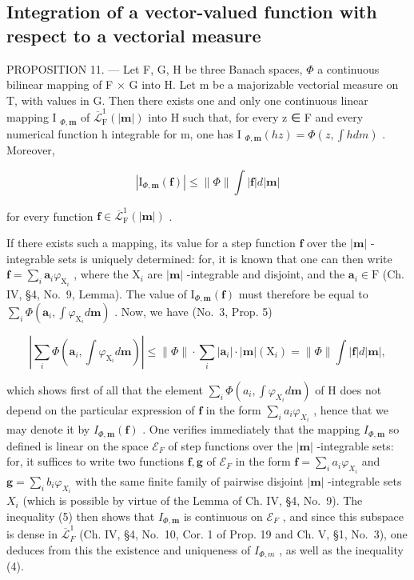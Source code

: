 \subsection{Integration of a vector-valued function with respect to a vectorial measure}

PROPOSITION 11. --- Let F, G, H be three Banach spaces, \(\Phi\) a continuous bilinear mapping of F × G into H. Let m be a majorizable vectorial measure on T, with values in G. Then there exists one and only one continuous linear mapping I \(_{\Phi,\mathbf{m}}\) of \(\overline{\mathcal{L}}_{\mathrm{F}}^{1}(|\mathbf{m}|)\) into H such that, for every z ∈ F and every numerical function h integrable for \textbar m\textbar, one has I \(_{\Phi,\mathbf{m}}(hz) = \Phi(z, \int h dm)\) . Moreover,

\[
\left| \mathrm{I} _ {\Phi , \mathbf {m}} (\mathbf {f}) \right| \leqslant \| \Phi \| \int | \mathbf {f} | d | \mathbf {m} |\tag{4}
\]

for every function \(\mathbf{f} \in \overline{\mathcal{L}}_{\mathrm{F}}^{1}(|\mathbf{m}|)\) .

If there exists such a mapping, its value for a step function \(\mathbf{f}\) over the \(|\mathbf{m}|\) -integrable sets is uniquely determined: for, it is known that one can then write \(\mathbf{f} = \sum_{i} \mathbf{a}_{i} \varphi_{\mathrm{X}_{i}}\) , where the \(\mathrm{X}_{i}\) are \(|\mathbf{m}|\) -integrable and disjoint, and the \(\mathbf{a}_{i} \in \mathrm{F}\) (Ch. IV, §4, No.~9, Lemma). The value of \(\mathrm{I}_{\Phi, \mathbf{m}}(\mathbf{f})\) must therefore be equal to \(\sum_{i} \Phi(\mathbf{a}_{i}, \int \varphi_{\mathrm{X}_{i}} d\mathbf{m})\) . Now, we have (No.~3, Prop. 5)

\[
\left| \sum_ {i} \Phi (\mathbf {a} _ {i}, \int \varphi_ {\mathrm{X} _ {i}} d \mathbf {m}) \right| \leqslant \| \Phi \| \cdot \sum_ {i} | \mathbf {a} _ {i} | \cdot | \mathbf {m} | (\mathrm{X} _ {i}) = \| \Phi \| \int | \mathbf {f} | d | \mathbf {m} |,\tag{5}
\]

which shows first of all that the element \(\sum_{i} \Phi(a_i, \int \varphi_{X_i} d\mathbf{m})\) of H does not depend on the particular expression of \(\mathbf{f}\) in the form \(\sum_{i} a_i \varphi_{X_i}\) , hence that we may denote it by \(I_{\Phi, \mathbf{m}}(\mathbf{f})\) . One verifies immediately that the mapping \(I_{\Phi, \mathbf{m}}\) so defined is linear on the space \(\mathcal{E}_F\) of step functions over the \(|\mathbf{m}|\) -integrable sets: for, it suffices to write two functions \(\mathbf{f}, \mathbf{g}\) of \(\mathcal{E}_F\) in the form \(\mathbf{f} = \sum_{i} a_i \varphi_{X_i}\) and \(\mathbf{g} = \sum_{i} b_i \varphi_{X_i}\) with the same finite family of pairwise disjoint \(|\mathbf{m}|\) -integrable sets \(X_i\) (which is possible by virtue of the Lemma of Ch. IV, §4, No.~9). The inequality (5) then shows that \(I_{\Phi, \mathbf{m}}\) is continuous on \(\mathcal{E}_F\) , and since this subspace is dense in \(\overline{\mathscr{L}}_F^1\) (Ch. IV, §4, No.~10, Cor. 1 of Prop. 19 and Ch. V, §1, No.~3), one deduces from this the existence and uniqueness of \(I_{\Phi,m}\) , as well as the inequality (4).

